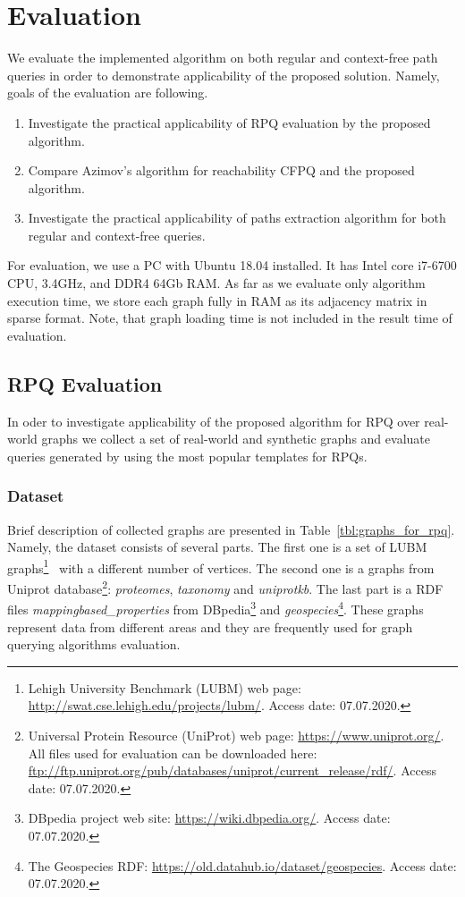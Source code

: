\section{Evaluation}

We evaluate the implemented algorithm on both regular and context-free path queries in order to demonstrate applicability of the proposed solution.
Namely, goals of the evaluation are following.
\begin{enumerate}
    \item Investigate the practical applicability of RPQ evaluation by the proposed algorithm.
    \item Compare Azimov's algorithm for reachability CFPQ and the proposed algorithm.
    \item Investigate the practical applicability of paths extraction algorithm for both regular and context-free queries.
\end{enumerate}

For evaluation, we use a PC with Ubuntu 18.04 installed.
It has Intel core i7-6700 CPU, 3.4GHz, and DDR4 64Gb RAM.
As far as we evaluate only algorithm execution time, we store each graph fully in RAM as its adjacency matrix in sparse format.
Note, that graph loading time is not included in the result time of evaluation. 

\subsection{RPQ Evaluation}

In oder to investigate applicability of the proposed algorithm for RPQ over real-world graphs we collect a set of real-world and synthetic graphs and evaluate queries generated by using the most popular templates for RPQs.

\subsubsection{Dataset}

Brief description of collected graphs are presented in Table~\ref{tbl:graphs_for_rpq}.
Namely, the dataset consists of several parts.
The first one is a set of LUBM graphs\footnote{Lehigh University Benchmark (LUBM) web page: \url{http://swat.cse.lehigh.edu/projects/lubm/}. Access date: 07.07.2020.}~\cite{10.1016/j.websem.2005.06.005} with a different number of vertices.
The second one is a graphs from Uniprot database\footnote{Universal Protein Resource (UniProt) web page: \url{https://www.uniprot.org/}. All files used for evaluation can be downloaded here: \url{ftp://ftp.uniprot.org/pub/databases/uniprot/current_release/rdf/}. Access date: 07.07.2020.}: \textit{proteomes}, \textit{taxonomy} and \textit{uniprotkb}.
The last part is a RDF files \textit{mappingbased\_properties} from DBpedia\footnote{DBpedia project web site: \url{https://wiki.dbpedia.org/}. Access date: 07.07.2020.} and \textit{geospecies}\footnote{The Geospecies RDF: \url{https://old.datahub.io/dataset/geospecies}. Access date: 07.07.2020.}.
These graphs represent data from different areas and they are frequently used for graph querying algorithms evaluation.

